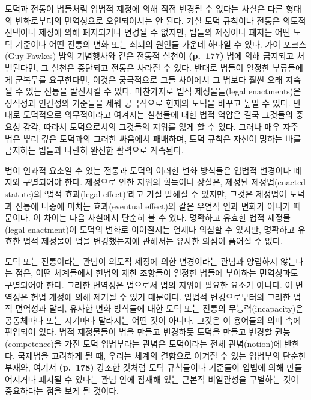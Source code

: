 도덕과 전통이 법들처럼 입법적 제정에 의해 직접 변경될 수 없다는 사실은
다른 형태의 변화로부터의 면역성으로 오인되어서는 안 된다. 기실 도덕
규칙이나 전통은 의도적 선택이나 제정에 의해 폐지되거나 변경될 수 없지만,
법들의 제정이나 폐지는 어떤 도덕 기준이나 어떤 전통의 변화 또는 쇠퇴의
원인들 가운데 하나일 수 있다. 가이 포크스(Guy Fawkes) 밤의 기념행사와
같은 전통적 실천이 \textbf{(p.~177)} 법에 의해 금지되고 처벌된다면, 그
실천은 중단되고 전통은 사라질 수 있다. 반대로 법들이 일정한 부류들에게
군복무를 요구한다면, 이것은 궁극적으로 그들 사이에서 그 법보다 훨씬 오래
지속될 수 있는 전통을 발전시킬 수 있다. 마찬가지로 법적 제정물들(legal
enactments)은 정직성과 인간성의 기준들을 세워 궁극적으로 현재의 도덕을
바꾸고 높일 수 있다. 반대로 도덕적으로 의무적이라고 여겨지는 실천들에
대한 법적 억압은 결국 그것들의 중요성 감각, 따라서 도덕으로서의 그것들의
지위를 잃게 할 수 있다. 그러나 매우 자주 법은 뿌리 깊은 도덕과의 그러한
싸움에서 패배하며, 도덕 규칙은 자신이 명하는 바를 금지하는 법들과 나란히
완전한 활력으로 계속된다.

법이 인과적 요소일 수 있는 전통과 도덕의 이러한 변화 방식들은 입법적
변경이나 폐지와 구별되어야 한다. 제정으로 인한  지위의
획득이나 상실은, 제정된 제정법(enacted statute)의 ‘법적 효과(legal
effect)’라고 기실 말해질 수 있지만, 그것은 제정법이 도덕과 전통에 나중에
미치는 효과(eventual effect)와 같은 우연적 인과 변화가 아니기 때문이다.
이 차이는 다음 사실에서 단순히 볼 수 있다. 명확하고 유효한 법적
제정물(legal enactment)이 도덕의 변화로 이어질지는 언제나 의심할 수
있지만, 명확하고 유효한 법적 제정물이 법을 변경했는지에 관해서는 유사한
의심이 품어질 수 없다.

도덕 또는 전통이라는 관념이 의도적 제정에 의한 변경이라는 관념과
양립하지 않는다는 점은, 어떤 체계들에서 헌법의 제한 조항들이 일정한
법들에 부여하는 면역성과도 구별되어야 한다. 그러한 면역성은 법으로서
법의 지위에 필요한 요소가 아니다. 이 면역성은 헌법 개정에 의해 제거될 수
있기 때문이다. 입법적 변경으로부터의 그러한 법적 면역성과 달리, 유사한
변화 방식들에 대한 도덕 또는 전통의 무능력(incapacity)은 공동체마다 또는
시기마다 달라지는 어떤 것이 아니다. 그것은 이 용어들의 의미 속에
편입되어 있다. 법적 제정물들이 법을 만들고 변경하듯 도덕을 만들고 변경할
권능(competence)을 가진 도덕 입법부라는 관념은 도덕이라는 전체
관념(notion)에 반한다. 국제법을 고려하게 될 때, 우리는 체계의 결함으로
여겨질 수 있는 입법부의 단순한  부재와, 여기서
\textbf{(p.~178)} 강조한 것처럼 도덕 규칙들이나 기준들이 입법에 의해
만들어지거나 폐지될 수 있다는 관념 안에 잠재해 있는 근본적 비일관성을
구별하는 것이 중요하다는 점을 보게 될 것이다.

